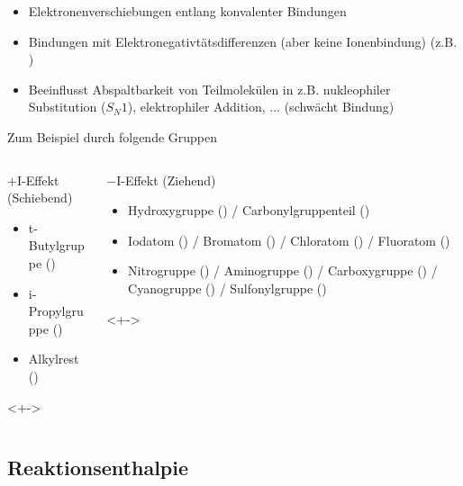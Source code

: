 \begin{itemize}
	\item<+-> Elektronenverschiebungen entlang konvalenter Bindungen
	\item<+-> Bindungen mit Elektronegativtätsdifferenzen (aber keine Ionenbindung) (z.B. )
	\item<+-> Beeinflusst Abspaltbarkeit von Teilmolekülen in z.B. nukleophiler Substitution ($S_N1$), elektrophiler Addition, ... (schwächt Bindung)
\end{itemize}
\pause
Zum Beispiel durch folgende Gruppen
\begin{columns}
\begin{column}{0.48\textwidth}
\begin{block}{$+\text{I}$-Effekt (Schiebend)}
\begin{itemize}
	\item t-Butylgruppe ()
	\item i-Propylgruppe ()
	\item Alkylrest ()
\end{itemize}
\end{block}
\begin{examples}<+->
\end{examples}
\end{column}
\begin{column}{0.48\textwidth}
\begin{block}{$-\text{I}$-Effekt (Ziehend)}
\begin{itemize}
	\item Hydroxygruppe () / Carbonylgruppenteil ()
	\item Iodatom () / Bromatom () / Chloratom () / Fluoratom ()
	\item Nitrogruppe () / Aminogruppe () / Carboxygruppe () / Cyanogruppe () / Sulfonylgruppe ()
\end{itemize}
\end{block}
\begin{examples}<+->
\end{examples}
\end{column}
\end{columns}


\subsection{Reaktionsenthalpie}

